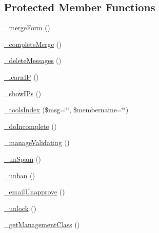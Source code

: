 \subsection*{Protected Member Functions}
\begin{DoxyCompactItemize}
\item 
\hyperlink{classadmin__members__members__tools_a07596a6c57df3906777dd37ab5bb93c6}{\-\_\-merge\-Form} ()
\item 
\hyperlink{classadmin__members__members__tools_af8ef1c46fd5ce0119ae53b376fbe37c1}{\-\_\-complete\-Merge} ()
\item 
\hyperlink{classadmin__members__members__tools_ac5c8d129f89e062695c2ed8f67710a93}{\-\_\-delete\-Messages} ()
\item 
\hyperlink{classadmin__members__members__tools_a49fabe1a22742070e6385b164ab0aa8b}{\-\_\-learn\-I\-P} ()
\item 
\hyperlink{classadmin__members__members__tools_a0bf8437331e4b5bf0823fafa49cea1b0}{\-\_\-show\-I\-Ps} ()
\item 
\hyperlink{classadmin__members__members__tools_a8570d5caa46221faff557d9023e49ae4}{\-\_\-tools\-Index} (\$msg=\char`\"{}\char`\"{}, \$membername=\char`\"{}\char`\"{})
\item 
\hyperlink{classadmin__members__members__tools_ab89c5067b1466f41af5d031626d14db2}{\-\_\-do\-Incomplete} ()
\item 
\hyperlink{classadmin__members__members__tools_ae49e7a2cff54b76aa50bd602752041ef}{\-\_\-manage\-Validating} ()
\item 
\hyperlink{classadmin__members__members__tools_a79d7c6555e7f46e23e5f4cc370c91982}{\-\_\-un\-Spam} ()
\item 
\hyperlink{classadmin__members__members__tools_a4ad5348c497be295ee4dc59f5f022117}{\-\_\-unban} ()
\item 
\hyperlink{classadmin__members__members__tools_a3ba21359fd8f70aad66bff460282f883}{\-\_\-email\-Unapprove} ()
\item 
\hyperlink{classadmin__members__members__tools_a0ed6d9e80c19ee7d330e07f04881ede3}{\-\_\-unlock} ()
\item 
\hyperlink{classadmin__members__members__tools_a8322230ea8607d989326e39cde8999fc}{\-\_\-get\-Management\-Class} ()
\end{DoxyCompactItemize}
